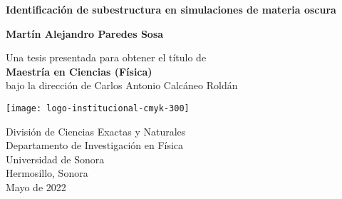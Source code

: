 

\setcounter{page}{1}


\newcommand{\thesistitle}{Identificación de
subestructura en simulaciones de materia oscura}
\newcommand{\minombre}{Martín Alejandro Paredes Sosa}
\newcommand{\supername}{Carlos Antonio Calcáneo Roldán}
\newcommand{\mespresentado}{Mayo de 2022}
\newpage

\thispagestyle{empty}
\begin{center}
  \vspace*{0.5cm}
  {\Huge \bf \thesistitle}

  \vspace*{2cm}
  {\LARGE\bf \minombre}

  \vfill

  {\Large Una tesis presentada para obtener el título de\\
    \vspace{.3cm}
    {\bf Maestría en Ciencias (Física)}\\
    \vspace{.6cm}
    bajo la dirección de \supername}
  \vspace*{0.9cm}

   \begin{center}
   \texttt{[image: logo-institucional-cmyk-300]}
   \end{center}

  {\large División de Ciencias Exactas y Naturales\\
          [-3mm] Departamento de Investigación en Física\\
          [-3mm] Universidad de Sonora\\
          [-3mm] Hermosillo, Sonora\\
          [1mm]  \mespresentado}

\end{center}

